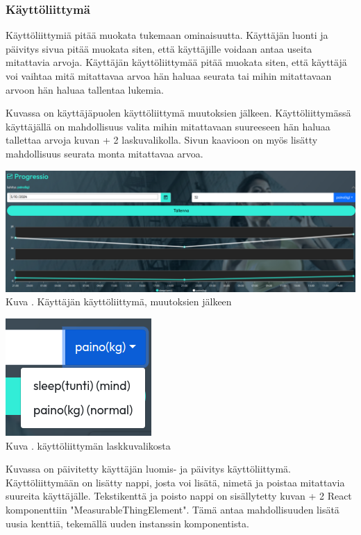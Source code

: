 \subsubsection{Käyttöliittymä}





Käyttöliittymiä pitää muokata tukemaan ominaisuutta.
Käyttäjän luonti ja päivitys sivua pitää muokata siten, että käyttäjille voidaan antaa useita mitattavia arvoja.
Käyttäjän käyttöliittymää pitää muokata siten,
että käyttäjä voi vaihtaa mitä mitattavaa arvoa hän haluaa seurata tai mihin mitattavaan arvoon hän haluaa tallentaa lukemia.
\medskip

Kuvassa \nextImageCount{} on käyttäjäpuolen käyttöliittymä muutoksien jälkeen.
Käyttöliittymässä käyttäjällä on mahdollisuus valita mihin mitattavaan suureeseen hän haluaa tallettaa arvoja kuvan {\the\numexpr \theimgCounter + 2 } laskuvalikolla.
Sivun kaavioon on myös lisätty mahdollisuus seurata monta mitattavaa arvoa.
\medskip

\bigskip
\includegraphics[width = 15cm]{src/public/progressmulti.png}\\
Kuva \getImgCount {}. Käyttäjän käyttöliittymä, muutoksien jälkeen 
\medskip

\bigskip
\includegraphics{src/public/progressselect.png}\\
Kuva \getImgCount {}. käyttöliittymän laskkuvalikosta
\medskip



Kuvassa \nextImageCount {} on päivitetty käyttäjän luomis- ja päivitys käyttöliittymä.
Käyttöliittymään on lisätty nappi, josta voi lisätä, nimetä ja poistaa mitattavia suureita käyttäjälle.
Tekstikenttä ja poisto nappi on sisällytetty kuvan {\the\numexpr \theimgCounter + 2 } React komponenttiin "MeasurableThingElement". 
Tämä antaa mahdollisuuden lisätä uusia kenttiä, tekemällä uuden instanssin komponentista.
%


